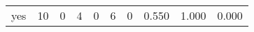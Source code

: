 \begin{longtable}{lp{2.0cm}p{2.0cm}p{2.0cm}p{2.0cm}p{2.0cm}p{2.0cm}p{2.0cm}p{2.0cm}p{2.0cm}}
yes       &                     10 &                                             0 &                                            4 &                                           0 &                                            6 &                                          0 &                                0.550 &                                  1.000 &                                0.000 \\
\end{longtable}
